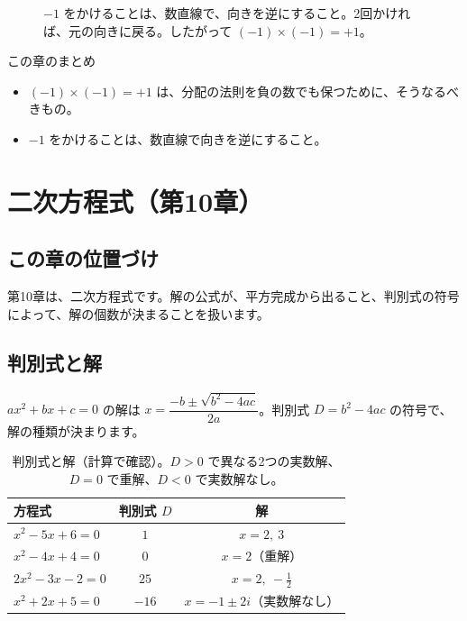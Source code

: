 \documentclass[a4paper,11pt,openany]{ltjsbook}
\begin{document}
\begin{figure}[htbp]
\centering
{}
\caption{$-1$ をかけることは、数直線で、向きを逆にすること。2回かければ、元の向きに戻る。したがって $(-1)\times(-1)=+1$。}
\end{figure}

\begin{pointbox}{この章のまとめ}
\begin{itemize}[leftmargin=*]
\item $(-1)\times(-1)=+1$ は、分配の法則を負の数でも保つために、そうなるべきもの。
\item $-1$ をかけることは、数直線で向きを逆にすること。
\end{itemize}
\end{pointbox}

\chapter{二次方程式（第10章）}

\section{この章の位置づけ}

第10章は、二次方程式です。解の公式が、平方完成から出ること、判別式の符号によって、解の個数が決まることを扱います。

\section{判別式と解}

$ax^2+bx+c=0$ の解は $x=\dfrac{-b\pm\sqrt{b^2-4ac}}{2a}$。判別式 $D=b^2-4ac$ の符号で、解の種類が決まります。

\begin{table}[htbp]
\centering
\begin{tabular}{lcc}
\toprule
方程式 & 判別式 $D$ & 解\\
\midrule
$x^2-5x+6=0$ & $1$ & $x=2,\ 3$\\
$x^2-4x+4=0$ & $0$ & $x=2$（重解）\\
$2x^2-3x-2=0$ & $25$ & $x=2,\ -\tfrac12$\\
$x^2+2x+5=0$ & $-16$ & $x=-1\pm2i$（実数解なし）\\
\bottomrule
\end{tabular}
\caption{判別式と解（計算で確認）。$D>0$ で異なる2つの実数解、$D=0$ で重解、$D<0$ で実数解なし。}
\end{table}
\end{document}
